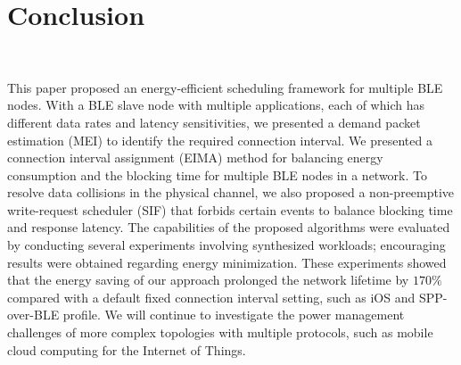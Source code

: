 \documentclass[10pt,journal,compsoc]{IEEEtran}
\begin{document}



\section{Conclusion}~\label{sec:con}

This paper proposed an energy-efficient scheduling framework for multiple BLE nodes. With a BLE slave node with multiple applications, each of which has different data rates and latency sensitivities, we presented a demand packet estimation (MEI) to identify the required connection interval. We presented a connection interval assignment (EIMA) method for balancing energy consumption and the blocking time for multiple BLE nodes in a network. To resolve data collisions in the physical channel, we also proposed a non-preemptive write-request scheduler (SIF) that forbids certain events to balance blocking time and response latency. The capabilities of the proposed algorithms were evaluated by conducting several experiments involving synthesized workloads; encouraging results were obtained regarding energy minimization. These experiments showed that the energy saving of our approach prolonged the network lifetime by $170\%$ compared with a default fixed connection interval setting, such as iOS and SPP-over-BLE profile. We will continue to investigate the power management challenges of more complex topologies with multiple protocols, such as mobile cloud computing for the Internet of Things.
\end{document}
